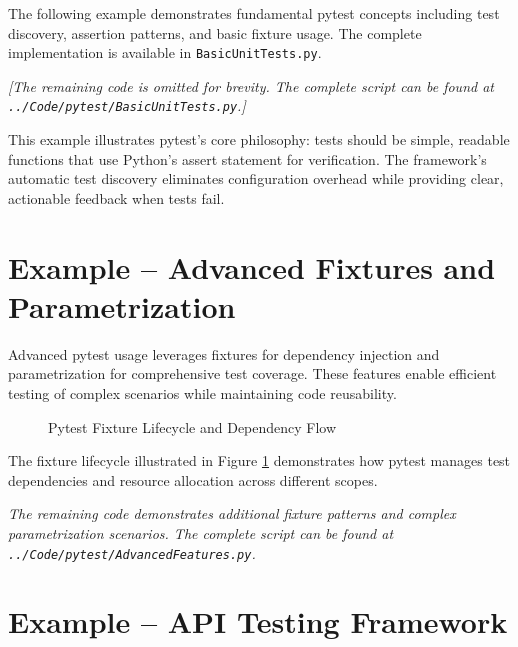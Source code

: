 The following example demonstrates fundamental pytest concepts including test discovery, assertion patterns, and basic fixture usage. The complete implementation is available in \texttt{BasicUnitTests.py}.



\noindent\textit{[The remaining code is omitted for brevity. The complete script can be found at \texttt{../Code/pytest/BasicUnitTests.py}.]}

This example illustrates pytest's core philosophy: tests should be simple, readable functions that use Python's assert statement for verification. The framework's automatic test discovery eliminates configuration overhead while providing clear, actionable feedback when tests fail.

\section{Example -- Advanced Fixtures and Parametrization}
\label{sec:advanced_example}

Advanced pytest usage leverages fixtures for dependency injection and parametrization for comprehensive test coverage. These features enable efficient testing of complex scenarios while maintaining code reusability.

\clearpage

\begin{figure}[htbp]
	\centering
    
	\caption{Pytest Fixture Lifecycle and Dependency Flow}
	\label{fig:fixture_flow}
\end{figure}

The fixture lifecycle illustrated in Figure \ref{fig:fixture_flow} demonstrates how pytest manages test dependencies and resource allocation across different scopes.


\noindent\textit{The remaining code demonstrates additional fixture patterns and complex parametrization scenarios. The complete script can be found at \texttt{../Code/pytest/AdvancedFeatures.py}.}

\section{Example -- API Testing Framework}
\label{sec:api_example}

